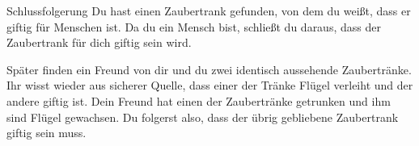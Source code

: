 \documentclass[../../main.tex]{subfiles}
\begin{document}
    
    
    \begin{example}{Schlussfolgerung}
        Du hast einen Zaubertrank gefunden, von dem du weißt, dass er giftig für Menschen ist. Da du ein Mensch bist, schließt du daraus, dass der Zaubertrank für dich giftig sein wird.
        
        Später finden ein Freund von dir und du zwei identisch aussehende Zaubertränke. Ihr wisst wieder aus sicherer Quelle, dass einer der Tränke Flügel verleiht und der andere giftig ist. Dein Freund hat einen der Zaubertränke getrunken und ihm sind Flügel gewachsen. Du folgerst also, dass der übrig gebliebene Zaubertrank giftig sein muss.
    \end{example}
    
\end{document}

